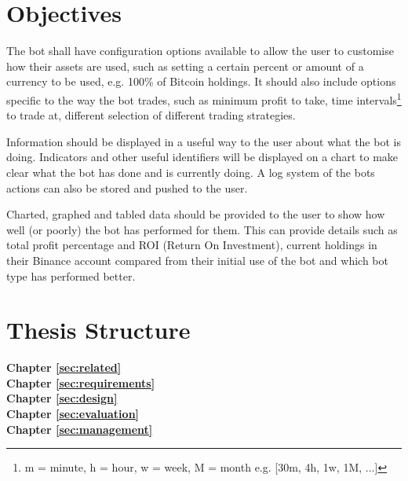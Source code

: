 \section{Objectives}
\label{sec:intro:objectives}
The bot shall have configuration options available to allow the user to customise how their assets are used, such as setting a certain percent or amount of a currency to be used, e.g. 100\% of Bitcoin holdings. It should also include options specific to the way the bot trades, such as minimum profit to take, time intervals\footnote{m = minute, h = hour, w = week, M = month e.g. [30m, 4h, 1w, 1M, ...]} to trade at, different selection of different trading strategies. \par
Information should be displayed in a useful way to the user about what the bot is doing. Indicators and other useful identifiers will be displayed on a chart to make clear what the bot has done and is currently doing. A log system of the bots actions can also be stored and pushed to the user. \par
Charted, graphed and tabled data should be provided to the user to show how well (or poorly) the bot has performed for them. This can provide details such as total profit percentage and ROI (Return On Investment), current holdings in their Binance account compared from their initial use of the bot and which bot type has performed better.



\section{Thesis Structure}
\label{sec:intro:structure}

\textbf{Chapter \ref{sec:related}} \\[0.2em]


\textbf{Chapter \ref{sec:requirements}} \\[0.2em]


\textbf{Chapter \ref{sec:design}} \\[0.2em]


\textbf{Chapter \ref{sec:evaluation}} \\[0.2em]


\textbf{Chapter \ref{sec:management}} \\[0.2em]

